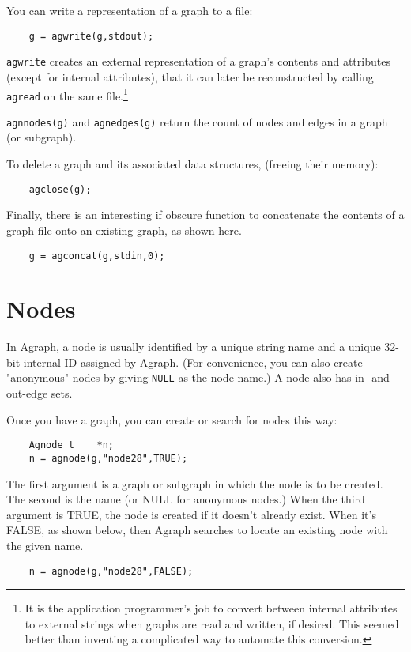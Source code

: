 \documentclass[11pt,letterpaper]{article}
\begin{document}
You can write a representation of a graph to a file:

\begin{verbatim}
    g = agwrite(g,stdout);
\end{verbatim}

\verb"agwrite" creates an external representation of a graph's
contents and attributes (except for internal attributes),
that it can later be reconstructed by calling \verb"agread"
on the same file.\footnote{It is the application programmer's job to
convert between internal attributes to external strings
when graphs are read and written, if desired.
This seemed better than inventing a complicated way
to automate this conversion.}

\verb"agnnodes(g)" and \verb"agnedges(g)" return the count of nodes
and edges in a graph (or subgraph).

To delete a graph and its associated data structures,
(freeing their memory):
\begin{verbatim}
    agclose(g);
\end{verbatim}

Finally, there is an interesting if obscure function to concatenate
the contents of a graph file onto an existing graph, as shown here.
\begin{verbatim}
    g = agconcat(g,stdin,0);
\end{verbatim}

\section{Nodes}
\label{sec:nodes}
In Agraph, a node is usually identified by a unique string name
and a unique 32-bit internal ID assigned by Agraph.
(For convenience, you can also create "anonymous" nodes by
giving \verb"NULL" as the node name.) A node also has in- and out-edge sets.

Once you have a graph, you can create or search for nodes this way:
\begin{verbatim}
    Agnode_t    *n;
    n = agnode(g,"node28",TRUE);
\end{verbatim}

The first argument is a graph or subgraph in which the node
is to be created.  The second is the name (or NULL for anonymous nodes.)
When the third argument is TRUE, the node is created if it doesn't
already exist.  When it's FALSE, as shown below, then Agraph 
searches to locate an existing node with the given name.

\begin{verbatim}
    n = agnode(g,"node28",FALSE);
\end{verbatim}
\end{document}
